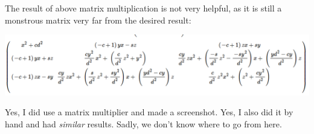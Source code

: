 \documentclass[a4paper,11pt]{article}
\begin{document}
\begin {enumerate}
		The result of above matrix multiplication is not very helpful, as it is
		still a monstrous matrix very far from the desired result:

		\includegraphics[width=\textwidth]{matrix.png}

		Yes, I did use a matrix multiplier and made a screenshot. Yes, I also
		did it by hand and had \emph{similar} results. Sadly, we don't know
		where to go from here.


\end {enumerate}
\end{document}
